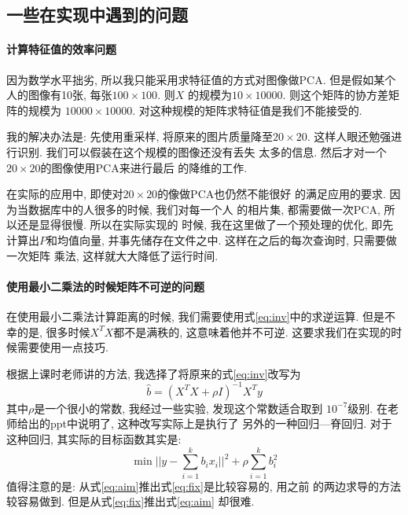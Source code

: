 \documentclass[fleqn,10pt]{SelfArx} %
\begin{document}
\subsection{一些在实现中遇到的问题}
	\paragraph{计算特征值的效率问题}
		因为数学水平拙劣, 所以我只能采用求特征值的方式对图像做PCA.
		但是假如某个人的图像有10张, 每张$100\times100$. 则$X$
		的规模为$10\times 10000$. 则这个矩阵的协方差矩阵的规模为
		$10000\times 10000$. 对这种规模的矩阵求特征值是我们不能接受的.
		
		我的解决办法是: 先使用重采样, 将原来的图片质量降至$20\times 20$.
		这样人眼还勉强进行识别. 我们可以假装在这个规模的图像还没有丢失
		太多的信息. 然后才对一个$20\times 20$的图像使用PCA来进行最后
		的降维的工作.

		在实际的应用中, 即使对$20\times 20$的像做PCA也仍然不能很好
		的满足应用的要求. 因为当数据库中的人很多的时候, 我们对每一个人
		的相片集, 都需要做一次PCA, 所以还是显得很慢. 所以在实际实现的
		时候, 我在这里做了一个预处理的优化, 即先计算出$P$和均值向量,
		并事先储存在文件之中. 这样在之后的每次查询时, 只需要做一次矩阵
		乘法, 这样就大大降低了运行时间.

	\paragraph{使用最小二乘法的时候矩阵不可逆的问题}
		在使用最小二乘法计算距离的时候, 我们需要使用式\ref{eq:inv}中的求逆运算.
		但是不幸的是, 很多时候$X^TX$都不是满秩的, 这意味着他并不可逆.
		这要求我们在实现的时候需要使用一点技巧. 

		根据上课时老师讲的方法, 我选择了将原来的式\ref{eq:inv}改写为
		\begin{equation}
			\hat{b} = (X^TX + \rho I)^{-1}X^Ty
			\label{eq:fix}
		\end{equation}
		其中$\rho$是一个很小的常数, 我经过一些实验, 发现这个常数适合取到
		$10^{-7}$级别.
		在老师给出的ppt\cite{ShenFuming:ppt}中说明了, 这种改写实际上是执行了
		另外的一种回归---脊回归.
		对于这种回归, 其实际的目标函数其实是:
		\begin{equation}
			\min ||y - \sum_{i=1}^k b_ix_i||^2 + \rho\sum_{i=1}^k b_i^2
			\label{eq:aim}
		\end{equation}
		值得注意的是: 从式\ref{eq:aim}推出式\ref{eq:fix}是比较容易的, 用之前
		的两边求导的方法较容易做到. 但是从式\ref{eq:fix}推出式\ref{eq:aim}
		却很难.

\end{document}
